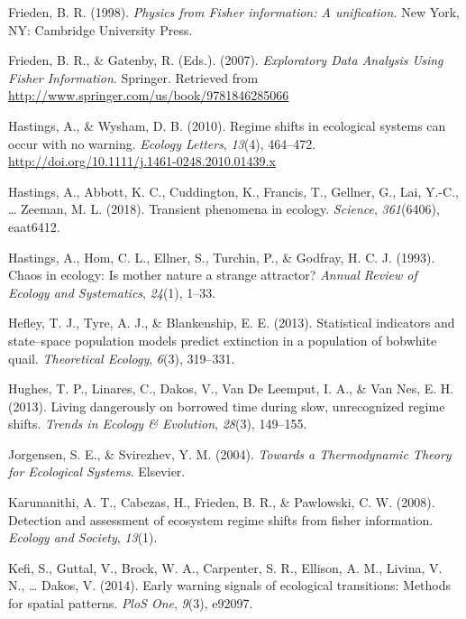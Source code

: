 \documentclass[12pt,twoside,openany]{reedthesis}
\begin{document}
\hypertarget{ref-frieden_physics_1998}{}
Frieden, B. R. (1998). \emph{Physics from Fisher information: A
unification.} New York, NY: Cambridge University Press.

\hypertarget{ref-frieden_exploratory_2007}{}
Frieden, B. R., \& Gatenby, R. (Eds.). (2007). \emph{Exploratory Data
Analysis Using Fisher Information}. Springer. Retrieved from
\url{http://www.springer.com/us/book/9781846285066}

\hypertarget{ref-hastings_regime_2010}{}
Hastings, A., \& Wysham, D. B. (2010). Regime shifts in ecological
systems can occur with no warning. \emph{Ecology Letters}, \emph{13}(4),
464--472. \url{http://doi.org/10.1111/j.1461-0248.2010.01439.x}

\hypertarget{ref-hastings2018transient}{}
Hastings, A., Abbott, K. C., Cuddington, K., Francis, T., Gellner, G.,
Lai, Y.-C., \ldots{} Zeeman, M. L. (2018). Transient phenomena in
ecology. \emph{Science}, \emph{361}(6406), eaat6412.

\hypertarget{ref-hastings1993chaos}{}
Hastings, A., Hom, C. L., Ellner, S., Turchin, P., \& Godfray, H. C. J.
(1993). Chaos in ecology: Is mother nature a strange attractor?
\emph{Annual Review of Ecology and Systematics}, \emph{24}(1), 1--33.

\hypertarget{ref-hefley2013statistical}{}
Hefley, T. J., Tyre, A. J., \& Blankenship, E. E. (2013). Statistical
indicators and state--space population models predict extinction in a
population of bobwhite quail. \emph{Theoretical Ecology}, \emph{6}(3),
319--331.

\hypertarget{ref-hughes_living_2013}{}
Hughes, T. P., Linares, C., Dakos, V., Van De Leemput, I. A., \& Van
Nes, E. H. (2013). Living dangerously on borrowed time during slow,
unrecognized regime shifts. \emph{Trends in Ecology \& Evolution},
\emph{28}(3), 149--155.

\hypertarget{ref-jorgensen_towards_2004}{}
Jorgensen, S. E., \& Svirezhev, Y. M. (2004). \emph{Towards a
Thermodynamic Theory for Ecological Systems}. Elsevier.

\hypertarget{ref-karunanithi_detection_2008}{}
Karunanithi, A. T., Cabezas, H., Frieden, B. R., \& Pawlowski, C. W.
(2008). Detection and assessment of ecosystem regime shifts from fisher
information. \emph{Ecology and Society}, \emph{13}(1).

\hypertarget{ref-kefi2014early}{}
Kefi, S., Guttal, V., Brock, W. A., Carpenter, S. R., Ellison, A. M.,
Livina, V. N., \ldots{} Dakos, V. (2014). Early warning signals of
ecological transitions: Methods for spatial patterns. \emph{PloS One},
\emph{9}(3), e92097.
\end{document}
